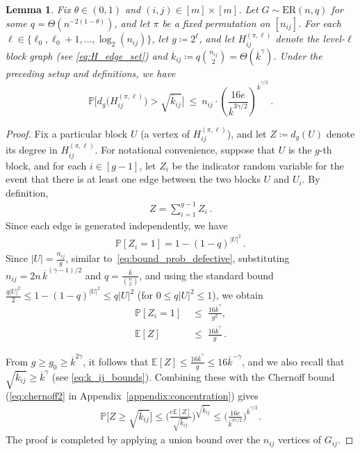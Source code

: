 \documentclass[journal]{IEEEtran}
\newtheorem{lemma}{Lemma}
\theoremstyle{definition}
\theoremstyle{definition}
\newcommand{\EE}{\mathbb{E}}
\newcommand{\PP}{\mathbb{P}}
\newcommand{\ER}{\mathrm{ER}}
\newcommand{\kb}{\overline{k}}
\begin{document}
\begin{lemma}\label{lem:fixed_per_degree}
Fix $\theta \in (0,1)$ and $(i,j) \in [m] \times [m]$. Let $G \sim \ER(n,q)$ for some $q = \Theta(n^{-2(1-\theta)})$, and let $\pi$ be a fixed permutation on $[n_{ij}]$. For each $\ell \in \{\ell_0,\ell_0+1,\dots,\log_2(n_{ij})\}$, let $g \coloneqq 2^\ell$, and let \(H_{ij}^{(\pi,\ell)}\) denote the level-\(\ell\) block graph (see \eqref{eq:H_edge_set}) and $\kb_{ij} \coloneqq q \binom{n_{ij}}{2} = \Theta(\kb^{\gamma})$. Under the preceding setup and definitions, we have
\[
\PP \Big[d_{g}\big(H_{ij}^{(\pi,\ell)}\big)>\sqrt{\kb_{ij}} \Big]\ \le\ n_{ij} \cdot \left( \frac{16e}{\kb^{3\gamma/2}}\right)^{\kb^{\gamma/2}}  \, .
\]
\end{lemma}

\begin{proof}
Fix a particular block $U$ (a vertex of $H_{ij}^{(\pi,\ell)}$), and let $Z \coloneqq d_{g}(U)$ denote its degree in $H_{ij}^{(\pi,\ell)}$.  For notational convenience, suppose that $U$ is the $g$-th block, and for each $i \in [g-1]$, let $Z_i$ be the indicator random variable for the event that there is at least one edge between the two blocks $U$ and $U_i$. By definition, %
\begin{align*}
    Z = \sum_{i=1}^{g-1} Z_i \, .
\end{align*}
Since each edge is generated independently, we have
\begin{align*}
    \PP[Z_i = 1] = 1 - (1-q)^{|U|^2} \, .
\end{align*}
Since $|U|=\tfrac{n_{ij}}{g}$, similar to~\eqref{eq:bound_prob_defective}, substituting $n_{ij}=2n\,\kb^{(\gamma-1)/2}$ and $q=\tfrac{\kb}{\binom{n}{2}}$, and using the standard bound $\tfrac{q|U|^{2}}{2}\le 1-(1-q)^{|U|^{2}}\le q|U|^{2}$ (for $0\le q|U|^{2}\le 1$), we obtain %
\begin{align*}
    \PP[Z_i=1] \;&\le\; \frac{16\kb^{\gamma}}{g^{2}},\\
    \EE[Z] \;&\le\; \frac{16\kb^{\gamma}}{g}\, .
\end{align*}


From $g\geq g_{0} \geq \kb^{2\gamma}$, it follows that
$\EE[Z]\le \frac{16\kb^{\gamma}}{g}\le  16 \kb^{-\gamma}$, and we also recall that $\sqrt{\kb_{ij}} \ge \kb^{\gamma}$ (see \eqref{eq:k_ij_bounds}). 
Combining these with the Chernoff bound (\eqref{eq:chernoff2} in Appendix~\ref{appendix:concentration}) gives
\begin{align*}
    \PP \Big[ Z \geq \sqrt{\kb_{ij}} \Big] \leq \Big( \frac{e\EE[Z]}{\sqrt{\kb_{ij}}}\Big)^{\sqrt{\kb_{ij}}}   
    \leq \Big( \frac{16e}{\kb^{3\gamma/2}} \Big)^{\kb^{\gamma/2}}.
\end{align*}
The proof is completed by applying a union bound over the $n_{ij}$ vertices of $G_{ij}$.
\end{proof}
\end{document}
